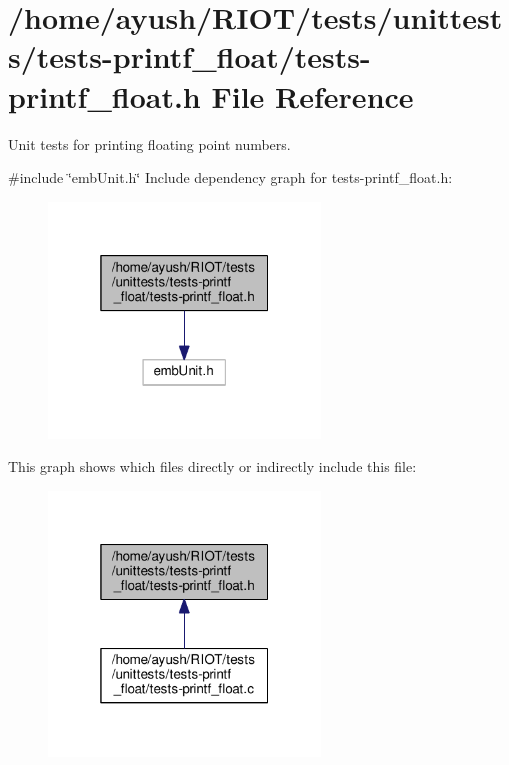 \hypertarget{tests-printf__float_8h}{}\section{/home/ayush/\+R\+I\+O\+T/tests/unittests/tests-\/printf\+\_\+float/tests-\/printf\+\_\+float.h File Reference}
\label{tests-printf__float_8h}


Unit tests for printing floating point numbers.  


{\ttfamily \#include \char`\"{}emb\+Unit.\+h\char`\"{}}\newline
Include dependency graph for tests-\/printf\+\_\+float.h\+:
\nopagebreak
\begin{figure}[H]
\begin{center}
\leavevmode
\includegraphics[width=205pt]{tests-printf__float_8h__incl}
\end{center}
\end{figure}
This graph shows which files directly or indirectly include this file\+:
\nopagebreak
\begin{figure}[H]
\begin{center}
\leavevmode
\includegraphics[width=205pt]{tests-printf__float_8h__dep__incl}
\end{center}
\end{figure}
